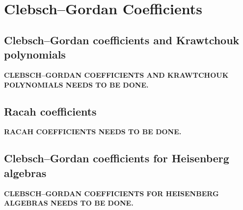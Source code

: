 \chapter{Clebsch--Gordan Coefficients}
\label{ch:12}
\section{Clebsch--Gordan coefficients and Krawtchouk polynomials}
\label{sec:12-1}

\noindent\textbf{CLEBSCH--GORDAN COEFFICIENTS AND KRAWTCHOUK POLYNOMIALS NEEDS TO BE DONE.}


\section{Racah coefficients}
\label{sec:12-2}

\noindent\textbf{RACAH COEFFICIENTS NEEDS TO BE DONE.}


\section{Clebsch--Gordan coefficients for Heisenberg algebras}
\label{sec:12-3}

\noindent\textbf{CLEBSCH--GORDAN COEFFICIENTS FOR HEISENBERG ALGEBRAS NEEDS TO BE DONE.}


